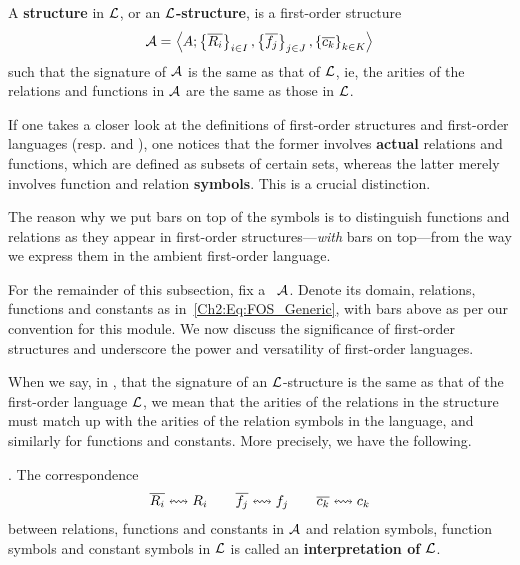 \begin{boxdefinition}\label{Ch2:Def:First-Order_Structure_in_First-Order_Language}
    A \textbf{structure} in $\mathcal{L}$, or an \textbf{$\mathcal{L}$-structure}, is a first-order structure
    \begin{align}
        \mathcal{A} = \left\langle A; \left\{ \overline{R_i} \right\}_{i \in I}, \left\{ \overline{f_j} \right\}_{j \in J}, \left\{ \overline{c_k} \right\}_{k \in K} \right\rangle
        \label{Ch2:Eq:FOS_Generic}
    \end{align}
    such that the signature of $\mathcal{A}$ is the same as that of $\mathcal{L}$, ie, the arities of the relations and functions in $\mathcal{A}$ are the same as those in $\mathcal{L}$.
\end{boxdefinition}

If one takes a closer look at the definitions of first-order structures and first-order languages (resp.  and ), one notices that the former involves \textbf{actual} relations and functions, which are defined as subsets of certain sets, whereas the latter merely involves function and relation \textbf{symbols}. This is a crucial distinction.

\begin{boxconvention}
    The reason why we put bars on top of the symbols is to distinguish functions and relations as they appear in first-order structures---\textit{with} bars on top---from the way we express them in the ambient first-order language.
\end{boxconvention}

For the remainder of this subsection, fix a \fos\ $\mathcal{A}$. Denote its domain, relations, functions and constants as in~\eqref{Ch2:Eq:FOS_Generic}, with bars above as per our convention for this module. We now discuss the significance of first-order structures and underscore the power and versatility of first-order languages.

When we say, in , that the signature of an $\mathcal{L}$-structure is the same as that of the first-order language $\mathcal{L}$, we mean that the arities of the relations in the structure must match up with the arities of the relation symbols in the language, and similarly for functions and constants. More precisely, we have the following.

\begin{boxdefinition}[Interpretation]
    \Letal. The correspondence
    \begin{align*}
        \overline{R_i} \leftrightsquigarrow R_i
        \qquad
        \overline{f_j} \leftrightsquigarrow f_j
        \qquad
        \overline{c_k} \leftrightsquigarrow c_k
    \end{align*}
    between relations, functions and constants in $\mathcal{A}$ and relation symbols, function symbols and constant symbols in $\mathcal{L}$ is called an \textbf{interpretation of $\mathcal{L}$}.
\end{boxdefinition}

